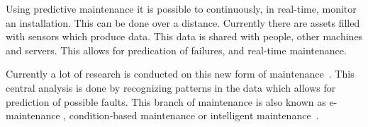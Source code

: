Using predictive maintenance it is possible to continuously, in real-time, monitor an installation. This can be done over a distance. Currently there are assets filled with sensors which produce data. This data is shared with people, other machines and servers. This allows for predication of failures, and real-time maintenance.

Currently a lot of research is conducted on this new form of maintenance~\citep{muller2008concept}. This central analysis is done by recognizing patterns in the data which allows for prediction of possible faults. This branch of maintenance is also known as e-maintenance \citep{yu2003multi}, condition-based maintenance or intelligent maintenance~\citep{vermaak2007multi}.







